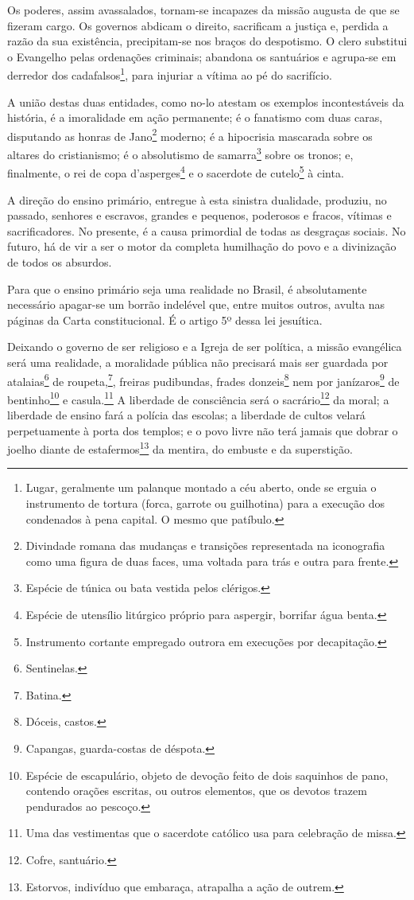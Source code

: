 Os poderes, assim avassalados, tornam-se incapazes da missão augusta de
que se fizeram cargo. Os governos abdicam o direito, sacrificam a
justiça e, perdida a razão da sua existência, precipitam-se nos braços
do despotismo. O clero substitui o Evangelho pelas ordenações criminais;
abandona os santuários e agrupa-se em derredor dos
cadafalsos\footnote{Lugar, geralmente um palanque montado a céu
  aberto, onde se erguia o instrumento de tortura (forca, garrote ou
  guilhotina) para a execução dos condenados à pena capital. O mesmo que
  patíbulo.\label{cadafalso}}, para injuriar a vítima ao pé do sacrifício.

A união destas duas entidades, como no-lo atestam os exemplos
incontestáveis da história, é a imoralidade em ação permanente; é o
fanatismo com duas caras, disputando as honras de Jano\footnote{
  Divindade romana das mudanças e transições representada na iconografia
  como uma figura de duas faces, uma voltada para trás e outra para
  frente.} moderno; é a hipocrisia mascarada sobre os altares do
cristianismo; é o absolutismo de samarra\footnote{Espécie de túnica ou
  bata vestida pelos clérigos.} sobre os tronos; e, finalmente, o rei de
copa d'asperges\footnote{Espécie de utensílio litúrgico próprio para
  aspergir, borrifar água benta.} e o sacerdote de cutelo\footnote{
  Instrumento cortante empregado outrora em execuções por decapitação.}
à cinta.

A direção do ensino primário, entregue à esta sinistra dualidade,
produziu, no passado, senhores e escravos, grandes e pequenos, poderosos
e fracos, vítimas e sacrificadores. No presente, é a causa primordial de
todas as desgraças sociais. No futuro, há de vir a ser o motor da
completa humilhação do povo e a divinização de todos os absurdos.

Para que o ensino primário seja uma realidade no Brasil, é absolutamente
necessário apagar-se um borrão indelével que, entre muitos outros,
avulta nas páginas da Carta constitucional. É o artigo 5º dessa lei
jesuítica.

Deixando o governo de ser religioso e a Igreja de ser política, a missão
evangélica será uma realidade, a moralidade pública não precisará mais
ser guardada por atalaias\footnote{Sentinelas.} de roupeta,\footnote{
  Batina.}, freiras pudibundas, frades donzeis\footnote{Dóceis,
  castos.} nem por janízaros\footnote{Capangas, guarda-costas de
  déspota.} de bentinho\footnote{Espécie de escapulário, objeto de
  devoção feito de dois saquinhos de pano, contendo orações escritas, ou
  outros elementos, que os devotos trazem pendurados ao pescoço.} e
casula.\footnote{Uma das vestimentas que o sacerdote católico usa para
  celebração de missa.} A liberdade de consciência será o
sacrário\footnote{Cofre, santuário.} da moral; a liberdade de ensino
fará a polícia das escolas; a liberdade de cultos velará perpetuamente à
porta dos templos; e o povo livre não terá jamais que dobrar o joelho
diante de estafermos\footnote{Estorvos, indivíduo que embaraça,
  atrapalha a ação de outrem.} da mentira, do embuste e da superstição.


